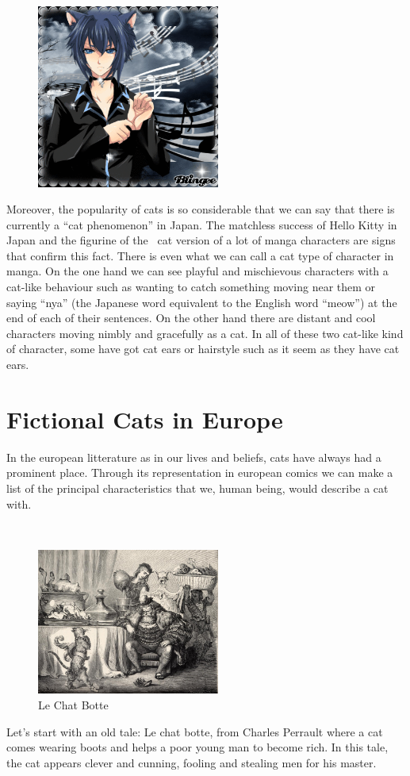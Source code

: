 \documentclass[a0,portrait,20pt]{a0poster}
\begin{document}
\begin{multicols}{2}
~

\begin{figure}\includegraphics[width=6cm]{a3.png}\end{figure}
Moreover, the popularity of cats is so considerable that we can say that there is currently a “cat phenomenon” in Japan. The matchless success of Hello Kitty in Japan and the figurine of the  cat version of a lot of manga characters are signs that confirm this fact. There is even what we can call a cat type of character in manga. On the one hand we can see playful and mischievous characters with a cat-like behaviour such as wanting to catch something moving near them or saying “nya” (the Japanese word equivalent to the English word “meow”) at the end of each of their sentences. On the other hand there are distant and cool characters moving nimbly and gracefully as a cat. In all of these two cat-like kind of character, some have got cat ears or hairstyle such as it seem as they have cat ears.



\section*{Fictional Cats in Europe}

In the european litterature as in our lives and beliefs, cats have always had a prominent place. Through its representation in european comics we can make a list of the principal characteristics that we, human being, would describe a cat with.

~

\begin{figure}\includegraphics[width=6cm]{botte.jpg}\caption{Le Chat Botte}\end{figure}
Let’s start with an old tale: Le chat botte, from Charles Perrault where a cat comes wearing boots and helps a poor young man to become rich. In this tale, the cat appears clever and cunning, fooling and stealing men for his master.


\end{multicols}
\end{document}
